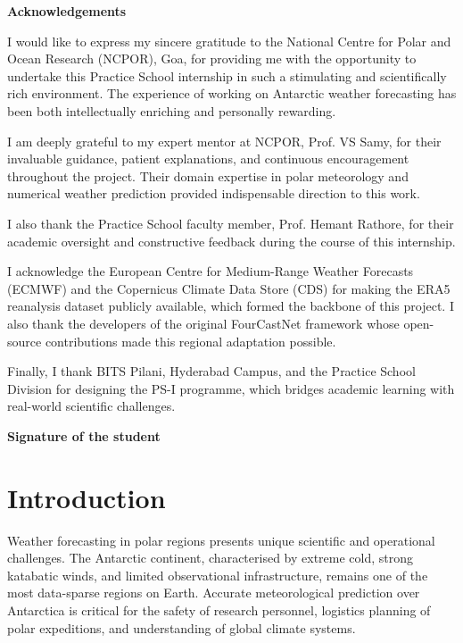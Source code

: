 \documentclass[12pt,titlepage,a4paper]{report}
\begin{document}
\clearpage
\begin{center}
    \textbf{\Large Acknowledgements}
\end{center}
\vspace{0.5cm}

\noindent
I would like to express my sincere gratitude to the National Centre for Polar and Ocean Research (NCPOR), Goa, for providing me with the opportunity to undertake this Practice School internship in such a stimulating and scientifically rich environment. The experience of working on Antarctic weather forecasting has been both intellectually enriching and personally rewarding.

I am deeply grateful to my expert mentor at NCPOR, Prof. VS Samy, for their invaluable guidance, patient explanations, and continuous encouragement throughout the project. Their domain expertise in polar meteorology and numerical weather prediction provided indispensable direction to this work.

I also thank the Practice School faculty member, Prof. Hemant Rathore, for their academic oversight and constructive feedback during the course of this internship.

I acknowledge the European Centre for Medium-Range Weather Forecasts (ECMWF) and the Copernicus Climate Data Store (CDS) for making the ERA5 reanalysis dataset publicly available, which formed the backbone of this project. I also thank the developers of the original FourCastNet framework whose open-source contributions made this regional adaptation possible.

Finally, I thank BITS Pilani, Hyderabad Campus, and the Practice School Division for designing the PS-I programme, which bridges academic learning with real-world scientific challenges.

\vspace{2.5cm}
\noindent
\textbf{Signature of the student}

\clearpage
\tableofcontents
\listoffigures
\listoftables

\chapter{Introduction}
Weather forecasting in polar regions presents unique scientific and operational challenges. The Antarctic continent, characterised by extreme cold, strong katabatic winds, and limited observational infrastructure, remains one of the most data-sparse regions on Earth. Accurate meteorological prediction over Antarctica is critical for the safety of research personnel, logistics planning of polar expeditions, and understanding of global climate systems.
\end{document}
